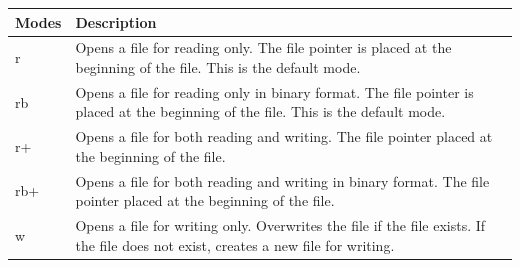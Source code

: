 \documentclass[11pt]{article}
\begin{document}
\begin{longtable}[]{@{}ll@{}}
\toprule
\begin{minipage}[b]{0.03\columnwidth}\raggedright\strut
Modes\strut
\end{minipage} & \begin{minipage}[b]{0.91\columnwidth}\raggedright\strut
Description\strut
\end{minipage}\tabularnewline
\midrule
\endhead
\begin{minipage}[t]{0.03\columnwidth}\raggedright\strut
r\strut
\end{minipage} & \begin{minipage}[t]{0.91\columnwidth}\raggedright\strut
Opens a file for reading only. The file pointer is placed at the
beginning of the file. This is the default mode.\strut
\end{minipage}\tabularnewline
\begin{minipage}[t]{0.03\columnwidth}\raggedright\strut
rb\strut
\end{minipage} & \begin{minipage}[t]{0.91\columnwidth}\raggedright\strut
Opens a file for reading only in binary format. The file pointer is
placed at the beginning of the file. This is the default mode.\strut
\end{minipage}\tabularnewline
\begin{minipage}[t]{0.03\columnwidth}\raggedright\strut
r+\strut
\end{minipage} & \begin{minipage}[t]{0.91\columnwidth}\raggedright\strut
Opens a file for both reading and writing. The file pointer placed at
the beginning of the file.\strut
\end{minipage}\tabularnewline
\begin{minipage}[t]{0.03\columnwidth}\raggedright\strut
rb+\strut
\end{minipage} & \begin{minipage}[t]{0.91\columnwidth}\raggedright\strut
Opens a file for both reading and writing in binary format. The file
pointer placed at the beginning of the file.\strut
\end{minipage}\tabularnewline
\begin{minipage}[t]{0.03\columnwidth}\raggedright\strut
w\strut
\end{minipage} & \begin{minipage}[t]{0.91\columnwidth}\raggedright\strut
Opens a file for writing only. Overwrites the file if the file exists.
If the file does not exist, creates a new file for writing.\strut

\end{minipage}
\end{longtable}
\end{document}
